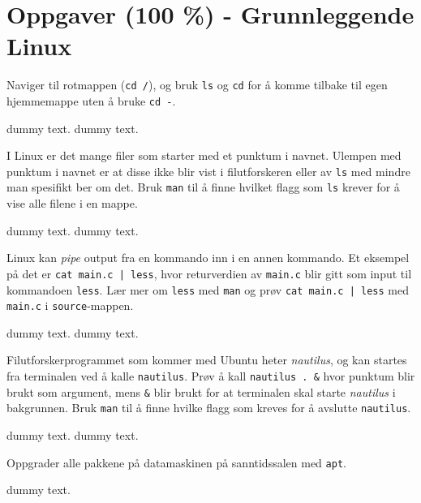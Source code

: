\section{Oppgaver (100 \%) - Grunnleggende Linux}\label{sec:3-oppgave}


\begin{subprob}
    Naviger til rotmappen (\verb|cd /|), og bruk \verb|ls| og \verb|cd| for å komme tilbake til egen hjemmemappe uten å bruke \verb|cd -|.
	\begin{solution}
	    dummy text. dummy text. 
	\end{solution}
\end{subprob}

\begin{subprob}
    I Linux er det mange filer som starter med et punktum i navnet. Ulempen med punktum i navnet er at disse ikke blir vist i filutforskeren eller av \verb|ls| med mindre man spesifikt ber om det. Bruk \verb|man| til å finne hvilket flagg som \verb|ls| krever for å vise alle filene i en mappe. 
	\begin{solution}
	    dummy text. dummy text. 
	\end{solution}
\end{subprob}

\begin{subprob}
    Linux kan \textit{pipe} output fra en kommando inn i en annen kommando. Et eksempel på det er \texttt{cat main.c | less}, hvor returverdien av \verb|main.c| blir gitt som input til kommandoen \verb|less|. Lær mer om \verb|less| med \verb|man| og prøv \texttt{cat main.c | less} med \verb|main.c| i \verb|source|-mappen.
    
	\begin{solution}
	    dummy text. dummy text. 
	\end{solution}
\end{subprob}

\begin{subprob}
    Filutforskerprogrammet som kommer med Ubuntu heter \textit{nautilus}, og kan startes fra terminalen ved å kalle \verb|nautilus|. Prøv å kall \verb|nautilus . &| hvor punktum blir brukt som argument, mens \verb|&| blir brukt for at terminalen skal starte \textit{nautilus} i bakgrunnen. Bruk \verb|man| til å finne hvilke flagg som kreves for å avslutte \verb|nautilus|.
    \begin{solution}
        dummy text. dummy text. 
	\end{solution}
\end{subprob}

\begin{subprob}
    Oppgrader alle pakkene på datamaskinen på sanntidssalen med \verb|apt|.
	\begin{solution}
	    dummy text. 
	\end{solution}
\end{subprob}


